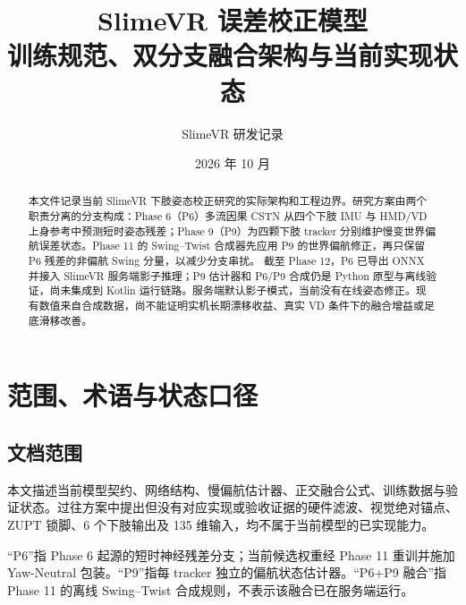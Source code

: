 \documentclass[UTF8,11pt,a4paper]{ctexart}
\title{\LARGE\bfseries SlimeVR 误差校正模型\\[0.3em]\large 训练规范、双分支融合架构与当前实现状态}
\author{SlimeVR 研发记录}
\date{2026 年 10 月}
\begin{document}
\maketitle

\begin{abstract}
本文件记录当前 SlimeVR 下肢姿态校正研究的实际架构和工程边界。研究方案由两个职责分离的分支构成：Phase 6（P6）多流因果 CSTN 从四个下肢 IMU 与 HMD/VD 上身参考中预测短时姿态残差；Phase 9（P9）为四颗下肢 tracker 分别维护慢变世界偏航误差状态。Phase 11 的 Swing--Twist 合成器先应用 P9 的世界偏航修正，再只保留 P6 残差的非偏航 Swing 分量，以减少分支串扰。
截至 Phase 12，P6 已导出 ONNX 并接入 SlimeVR 服务端影子推理；P9 估计器和 P6/P9 合成仍是 Python 原型与离线验证，尚未集成到 Kotlin 运行链路。服务端默认影子模式，当前没有在线姿态修正。现有数值来自合成数据，尚不能证明实机长期漂移收益、真实 VD 条件下的融合增益或足底滑移改善。
\end{abstract}

\tableofcontents
\newpage

\section{范围、术语与状态口径}

\subsection{文档范围}
本文描述当前模型契约、网络结构、慢偏航估计器、正交融合公式、训练数据与验证状态。过往方案中提出但没有对应实现或验收证据的硬件滤波、视觉绝对锚点、ZUPT 锁脚、6 个下肢输出及 135 维输入，均不属于当前模型的已实现能力。

“P6”指 Phase 6 起源的短时神经残差分支；当前候选权重经 Phase 11 重训并施加 Yaw-Neutral 包装。“P9”指每 tracker 独立的偏航状态估计器。“P6+P9 融合”指 Phase 11 的离线 Swing--Twist 合成规则，不表示该融合已在服务端运行。
\end{document}
